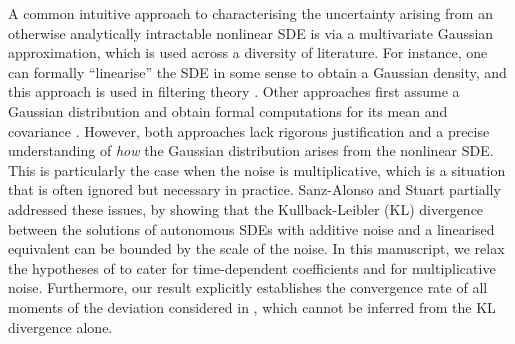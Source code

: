 A common intuitive approach to characterising the uncertainty arising from an otherwise analytically intractable nonlinear SDE is via a multivariate Gaussian approximation, which is used across a diversity of literature.
For instance, one can formally ``linearise'' the SDE in some sense to obtain a Gaussian density, and this approach is used in filtering theory \cite{Jazwinski_2014_StochasticProcessesFiltering}.
Other approaches first assume a Gaussian distribution and obtain formal computations for its mean and covariance \cite{SarkkaSolin_2019_AppliedStochasticDifferential}.
However, both approaches lack rigorous justification and a precise understanding of \emph{how} the Gaussian distribution arises from the nonlinear SDE.
This is particularly the case when the noise is multiplicative, which is a situation that is often ignored but necessary in practice.
Sanz-Alonso and Stuart \cite{Sanz-AlonsoStuart_2017_GaussianApproximationsSmall} partially addressed these issues, by showing that the Kullback-Leibler (KL) divergence between the solutions of autonomous SDEs with additive noise and a linearised equivalent can be bounded by the scale of the noise. In this manuscript, we relax the hypotheses of \cite{Sanz-AlonsoStuart_2017_GaussianApproximationsSmall} to cater for time-dependent coefficients and for multiplicative noise. Furthermore, our result explicitly establishes the convergence rate of all moments of the deviation considered in \cite{Sanz-AlonsoStuart_2017_GaussianApproximationsSmall}, which cannot be inferred from the KL divergence alone.



